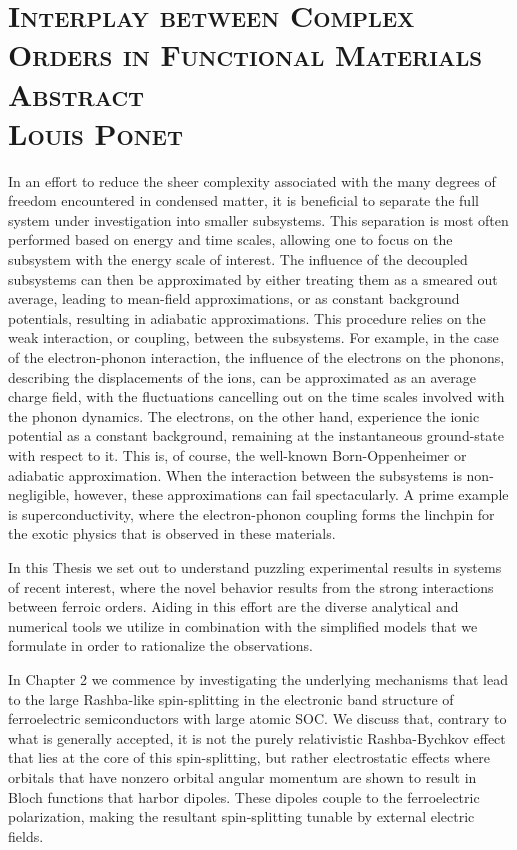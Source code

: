 \documentclass[10pt, a4paper]{article}
\begin{document}
\section*{\textsc{{\huge Interplay between Complex Orders in Functional Materials}\\[0.1cm] Abstract\\[0.2cm] {\normalsize Louis Ponet}}}

\vspace{0.4cm}
In an effort to reduce the sheer complexity associated with the many degrees of freedom encountered in condensed matter, it is beneficial to separate the full system under investigation into smaller subsystems.
This separation is most often performed based on energy and time scales, allowing one to focus on the subsystem with the energy scale of interest.
The influence of the decoupled subsystems can then be approximated by either treating them as a smeared out average, leading to mean-field approximations, or as constant background potentials, resulting in adiabatic approximations. This procedure relies on the weak interaction, or coupling, between the subsystems.
For example, in the case of the electron-phonon interaction, the influence of the electrons on the phonons, describing the displacements of the ions, can be approximated as an average charge field, with the fluctuations cancelling out on the time scales involved with the phonon dynamics.
The electrons, on the other hand, experience the ionic potential as a constant background, remaining at the instantaneous ground-state with respect to it. This is, of course, the well-known Born-Oppenheimer or adiabatic approximation.
When the interaction between the subsystems is non-negligible, however, these approximations can fail spectacularly.
A prime example is superconductivity, where the electron-phonon coupling forms the linchpin for the exotic physics that is observed in these materials.

In this Thesis we set out to understand puzzling experimental results in systems of recent interest, where the novel behavior results from the strong interactions between ferroic orders.
Aiding in this effort are the diverse analytical and numerical tools we utilize in combination with the simplified models that we formulate in order to rationalize the observations. 

In Chapter 2 we commence by investigating the underlying mechanisms that lead to the large Rashba-like spin-splitting in the electronic band structure of ferroelectric semiconductors with large atomic SOC.
We discuss that, contrary to what is generally accepted, it is not the purely relativistic Rashba-Bychkov effect that lies at the core of this spin-splitting, but rather electrostatic effects where orbitals that have nonzero orbital angular momentum are shown to result in Bloch functions that harbor dipoles. These dipoles couple to the ferroelectric polarization, making the resultant spin-splitting tunable by external electric fields.
\end{document}
